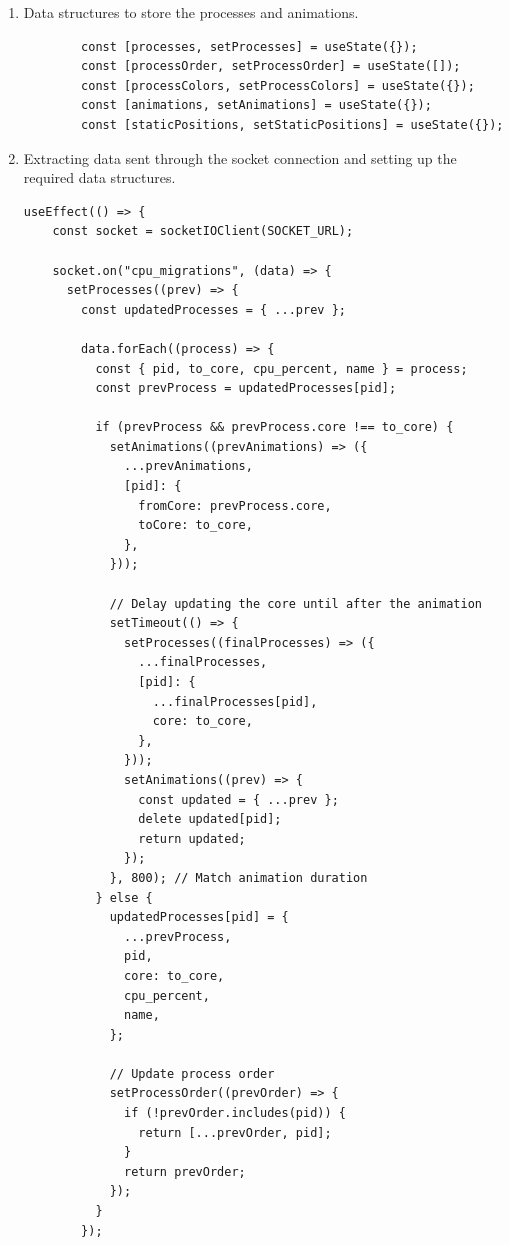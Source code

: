 \documentclass[12pt]{article}
\begin{document}
\begin{enumerate}
    \item Data structures to store the processes and animations.
    \begin{verbatim}
        const [processes, setProcesses] = useState({});
        const [processOrder, setProcessOrder] = useState([]); 
        const [processColors, setProcessColors] = useState({});
        const [animations, setAnimations] = useState({});
        const [staticPositions, setStaticPositions] = useState({});
    \end{verbatim}
    \item Extracting data sent through the socket connection and setting up the required data structures. 
\begin{verbatim}
useEffect(() => {
    const socket = socketIOClient(SOCKET_URL);

    socket.on("cpu_migrations", (data) => {
      setProcesses((prev) => {
        const updatedProcesses = { ...prev };

        data.forEach((process) => {
          const { pid, to_core, cpu_percent, name } = process;
          const prevProcess = updatedProcesses[pid];

          if (prevProcess && prevProcess.core !== to_core) {
            setAnimations((prevAnimations) => ({
              ...prevAnimations,
              [pid]: {
                fromCore: prevProcess.core,
                toCore: to_core,
              },
            }));

            // Delay updating the core until after the animation
            setTimeout(() => {
              setProcesses((finalProcesses) => ({
                ...finalProcesses,
                [pid]: {
                  ...finalProcesses[pid],
                  core: to_core,
                },
              }));
              setAnimations((prev) => {
                const updated = { ...prev };
                delete updated[pid];
                return updated;
              });
            }, 800); // Match animation duration
          } else {
            updatedProcesses[pid] = {
              ...prevProcess,
              pid,
              core: to_core,
              cpu_percent,
              name,
            };

            // Update process order
            setProcessOrder((prevOrder) => {
              if (!prevOrder.includes(pid)) {
                return [...prevOrder, pid];
              }
              return prevOrder;
            });
          }
        });


\end{verbatim}
\end{enumerate}
\end{document}
